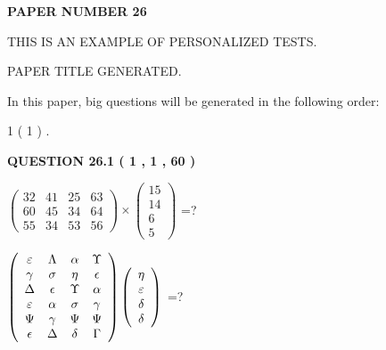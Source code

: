 \documentclass[12pt]{article}
\begin{document}
 
 
   
   
\newpage 
\setcounter{page}{ 
    26001 } 
   
   
   
   
 {\textbf{ \Large{ PAPER NUMBER           26  }}}
   
   
\vspace{0.2in}
   
   
   
   
   
   
   
   
 \vspace{0.2in}
{\Huge  THIS IS AN EXAMPLE OF}
{\Huge  PERSONALIZED TESTS. }
   
   
 PAPER TITLE GENERATED.
   
   
   
\vspace{0.2in}
   
In this paper, big questions will be generated in the following order: 
   
   
             1 (           1 )
 .
  
\vspace{0.2in}
  
{\textbf{\Large{QUESTION
26.1 
 (           1 ,           1 ,          60 )
}}}
  
  
 
$ \left( \begin{array}{ccccccccc}
          32  & 
          41  & 
          25  & 
          63  \\ 
          60  & 
          45  & 
          34  & 
          64  \\ 
          55  & 
          34  & 
          53  & 
          56
\end{array}\right) \times
\left( \begin{array}{c}
          15  \\ 
          14  \\ 
           6  \\ 
           5
\end{array}\right) $ =?
 
 
$  %
 \left( \begin{array}
 {
 c
 c
 c
 c
 }
 \varepsilon & 
 \Lambda & 
 \alpha & 
 \Upsilon \\ 
 \gamma & 
 \sigma & 
 \eta & 
 \epsilon \\ 
 \Delta & 
 \epsilon & 
 \Upsilon & 
 \alpha \\ 
 \varepsilon & 
 \alpha & 
 \sigma & 
 \gamma \\ 
 \Psi & 
 \gamma & 
 \Psi & 
 \Psi \\ 
 \epsilon & 
 \Delta & 
 \delta & 
 \Gamma
 \end{array} \right)
 \left( \begin{array}
 {
 c
 }
 \eta \\ 
 \varepsilon \\ 
 \delta \\ 
 \delta
 \end{array} \right)
$ =?
 
\end{document}
